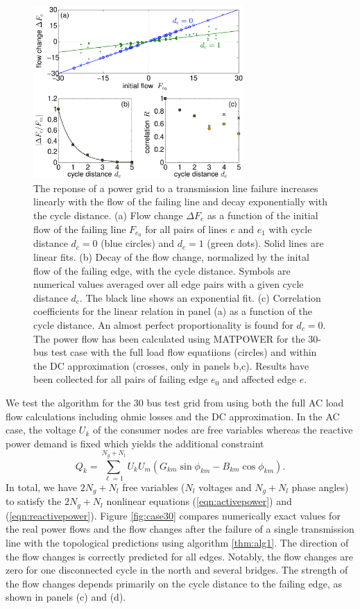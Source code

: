 \documentclass[10pt,aps,pra,twocolumn,superscriptaddress]{revtex4-1}
\newcommand{\be}{\begin{equation}}
\newcommand{\ee}{\end{equation}}
\begin{document}
\begin{figure}[tb]
\includegraphics[width=8cm]{pics/case30d_fchange_quant2.pdf}
\caption{
\label{fig:case30q}
The reponse of a power grid to a transmission line failure increases linearly
with the flow of the failing line and decay exponentially with the cycle distance. 
(a) Flow change $\Delta F_{e}$ as a function of the initial flow of the failing
line $F_{e_0}$ for all pairs of lines $e$ and $e_1$ with cycle distance
$d_c =0$ (blue circles) and $d_c=1$ (green dots). Solid lines are linear fits.
(b) Decay of the flow change, normalized by the inital flow of the failing edge, 
with the cycle distance. Symbols are numerical values averaged over all edge
pairs with a given cycle distance $d_c$. The black line shows an exponential fit.
(c) Correlation coefficients for the linear relation in panel (a) as a function of the 
cycle distance. An almost perfect proportionality is found for $d_c=0$.
The power flow has been calculated using 
MATPOWER for the 30-bus test case \cite{MATPOWER} with the full
load flow equatiions (circles) and within the DC approximation (crosses, only
in panels b,c). Results have been collected for all pairs of failing edge $e_0$
and affected edge $e$.
}
\end{figure}

We test the algorithm for the 30 bus test grid from \cite{MATPOWER} using both the full AC load flow calculations including ohmic losses and the DC approximation. In the AC case, the voltage $U_k$ of the consumer nodes are free variables whereas the reactive power demand is fixed which yields the additional constraint \cite{Wood13} 
\be
   Q_k = \sum_{\ell=1}^{N_g+N_l} U_k U_m
            \left( G_{k m} \sin \phi_{km}-B_{k m}\cos\phi_{km} \right).   
   \label{eqn:reactivepower}
\ee  
In total, we have $2 N_g + N_l$ free variables ($N_l$ voltages and $N_g+N_l$ phase angles) to satisfy the $2 N_g + N_l$ nonlinear equations (\ref{eqn:activepower}) and (\ref{eqn:reactivepower}). Figure \ref{fig:case30} compares numerically exact values for the real power flows and the flow changes after the failure of a single transmission line with the topological predictions using algorithm \ref{thm:alg1}. The direction of the flow changes is correctly predicted for all edges. Notably, the flow changes are zero for one disconnected cycle in the north and several bridges. The strength of the flow changes depends primarily on the cycle distance to the failing edge, as shown in panels (c) and (d).
\end{document}
